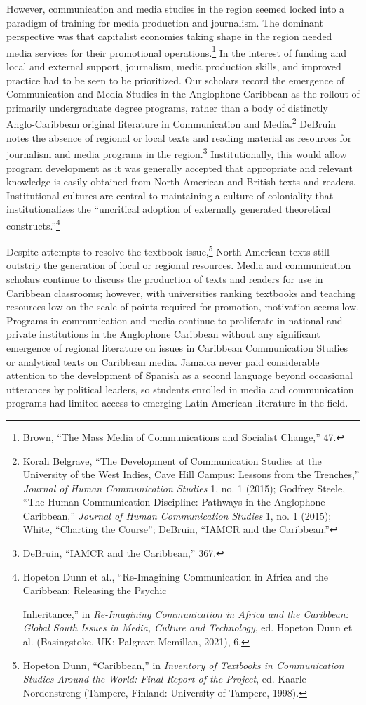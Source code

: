 \documentclass{tufte-handout}
\begin{document}
However, communication and media studies in the region seemed locked
into a paradigm of training for media production and journalism. The
dominant perspective was that capitalist economies taking shape in the
region needed media services for their promotional
operations.\footnote{Brown, ``The Mass Media of Communications and
  Socialist Change,'' 47.} In the interest of funding and local and
external support, journalism, media production skills, and improved
practice had to be seen to be prioritized. Our scholars record the
emergence of Communication and Media Studies in the Anglophone Caribbean
as the rollout of primarily undergraduate degree programs, rather than a
body of distinctly Anglo-Caribbean original literature in Communication
and Media.\footnote{Korah Belgrave, ``The Development of Communication
  Studies at the University of the West Indies, Cave Hill Campus:
  Lessons from the Trenches,'' \emph{Journal of Human Communication
  Studies} 1, no. 1 (2015); Godfrey Steele, ``The Human Communication
  Discipline: Pathways in the Anglophone Caribbean,'' \emph{Journal of
  Human Communication Studies} 1, no. 1 (2015); White, ``Charting the
  Course''; DeBruin, ``IAMCR and the Caribbean.''} DeBruin notes the
absence of regional or local texts and reading material as resources for
journalism and media programs in the region.\footnote{DeBruin, ``IAMCR
  and the Caribbean,'' 367.} Institutionally, this would allow program
development as it was generally accepted that appropriate and relevant
knowledge is easily obtained from North American and British texts and
readers. Institutional cultures are central to maintaining a culture of
coloniality that institutionalizes the ``uncritical adoption of
externally generated theoretical constructs.''\footnote{Hopeton Dunn et
  al., ``Re-Imagining Communication in Africa and the Caribbean:
  Releasing the Psychic

  Inheritance,'' in \emph{Re-Imagining Communication in Africa and the
  Caribbean: Global South Issues in Media, Culture and Technology}, ed.
  Hopeton Dunn et al. (Basingstoke, UK: Palgrave Mcmillan, 2021), 6.}

Despite attempts to resolve the textbook issue,\footnote{Hopeton Dunn,
  ``Caribbean,'' in \emph{Inventory of Textbooks in Communication
  Studies Around the World: Final Report of the Project}, ed. Kaarle
  Nordenstreng (Tampere, Finland: University of Tampere, 1998).} North
American texts still outstrip the generation of local or regional
resources. Media and communication scholars continue to discuss the
production of texts and readers for use in Caribbean classrooms;
however, with universities ranking textbooks and teaching resources low
on the scale of points required for promotion, motivation seems low.
Programs in communication and media continue to proliferate in national
and private institutions in the Anglophone Caribbean without any
significant emergence of regional literature on issues in Caribbean
Communication Studies or analytical texts on Caribbean media. Jamaica
never paid considerable attention to the development of Spanish as a
second language beyond occasional utterances by political leaders, so
students enrolled in media and communication programs had limited access
to emerging Latin American literature in the field.
\end{document}
